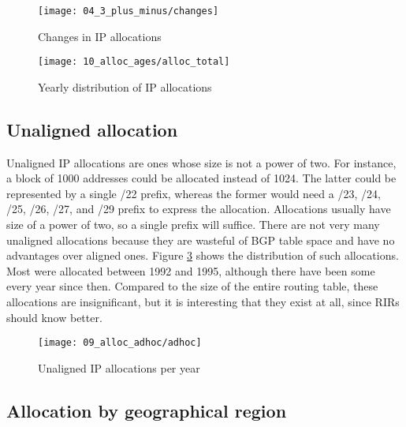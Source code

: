\begin{figure}[htbp]
    \centering
        \texttt{[image: 04\_3\_plus\_minus/changes]}
    \caption{Changes in IP allocations}
    \label{fig:IP allocations new and gone}
\end{figure}


\begin{figure}[htbp]
	\centering
		\texttt{[image: 10\_alloc\_ages/alloc\_total]}
	\caption{Yearly distribution of IP allocations}
	\label{fig:alloc ages total}
\end{figure}

\subsection{Unaligned allocation} 

Unaligned IP allocations are ones whose size
is not a power of two. For instance, a block of 1000 addresses could be
allocated instead of 1024. The latter could be represented by a single /22
prefix, whereas the former would need a /23, /24, /25, /26, /27, and /29
prefix to express the allocation. Allocations usually have size of a power of
two, so a single prefix will suffice. There are not very many unaligned
allocations because they are wasteful of BGP table space and have no
advantages over aligned ones. Figure \ref{fig:unaligned IP allocations} shows
the distribution of such allocations. Most were allocated between 1992 and
1995, although there have been some every year since then. Compared to the
size of the entire routing table, these allocations are insignificant, but it
is interesting that they exist at all, since RIRs should know better.

\begin{figure}[htbp]
 	\centering
 		\texttt{[image: 09\_alloc\_adhoc/adhoc]}
	\caption{Unaligned IP allocations per year}
 	\label{fig:unaligned IP allocations}
\end{figure}
\subsection{Allocation by geographical region}




